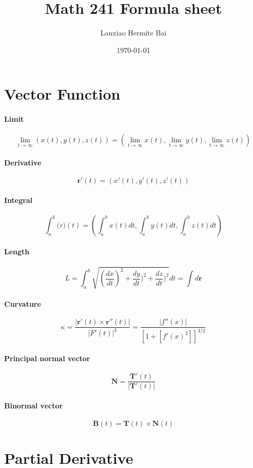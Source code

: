 \documentclass[12pt]{article}
\title{Math 241 Formula sheet}
\author{Lanxiao Hermite Bai}
\date{\today}
\begin{document}
\maketitle
\newpage
\tableofcontents
\newpage

\section{Vector Function}

\paragraph{Limit}
\[\lim_{t \rightarrow \infty}(x(t), y(t), z(t)) = (\lim_{t \rightarrow \infty}x(t), \lim_{t \rightarrow \infty}y(t), \lim_{t \rightarrow \infty}z(t))\]
\paragraph{Derivative}
\[\mathbf{r}'(t) = (x'(t), y'(t), z'(t))\]

\paragraph{Integral}
\[\int_a^b \mathbf(r)(t) = (\int_a^b x(t)dt, \int_a^b y(t)dt, \int_a^b z(t)dt)\]

\paragraph{Length}
\[L = \int_a^b \sqrt{(\frac{dx}{dt})^2 + \frac{dy}{dt})^2 + \frac{dz}{dt})^2}dt = \int d\mathbf{r}\]

\paragraph{Curvature}
\[\kappa = \frac{|\mathbf{r}'(t) \times \mathbf{r}''(t)|}{|F'(t)|^3} = \frac{|f''(x)|}{[1 + [f'(x)^2]]^{3/2}}\]

\paragraph{Principal normal vector}
\[\mathbf{N} = \frac{\mathbf{T}'(t)}{|\mathbf{T}'(t)|}\]

\paragraph{Binormal vector}
\[\mathbf{B}(t) = \mathbf{T}(t) \times \mathbf{N}(t)\]		
\section{Partial Derivative}
\end{document}
